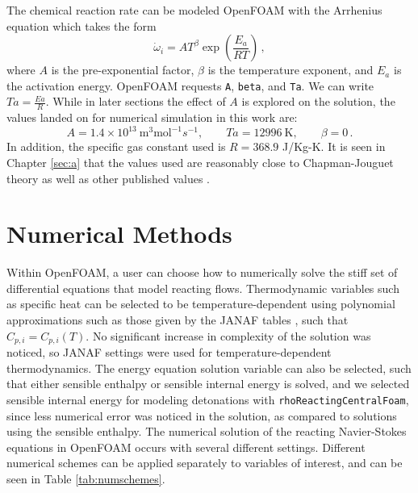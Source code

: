 The chemical reaction rate can be modeled OpenFOAM with the Arrhenius equation \cite{arrhenius} which takes the form \cite{christ} 
\begin{equation}
\dot{\omega}_i = AT^\beta \exp\left(\frac{E_a}{R T}\right)\,,
\end{equation}
where $A$ is the pre-exponential factor, $\beta$ is the temperature exponent, and $E_a$ is the activation energy. OpenFOAM requests \verb|A|, \verb|beta|, and \verb|Ta|. We can write \(Ta = \frac{Ea}{R }\). While in later sections the effect of \(A\) is explored on the solution, the values landed on for numerical simulation in this work are:
\begin{equation}
   A = 1.4 \times 10^{13} ~ \text{m}^3\text{mol}^{-1}s^{-1},
   \qquad 
   Ta = 12996 ~\text{K},
   \qquad
   \beta = 0\,.
\end{equation}
\noindent In addition, the specific gas constant used is \(R = 368.9\) J/Kg-K. It is seen in Chapter \ref{sec:a} that the values used are reasonably close to Chapman-Jouguet theory as well as other published values \cite{towery1}\cite{hashemi}. 

\section{Numerical Methods}
Within OpenFOAM, a user can choose how to numerically solve the stiff set of differential equations that model reacting flows. Thermodynamic variables such as specific heat can be selected to be temperature-dependent using polynomial approximations such as those given by the JANAF tables \cite{janaf}, such that \(C_{p,i} = C_{p,i}(T)\). No significant increase in complexity of the solution was noticed, so JANAF settings were used for temperature-dependent thermodynamics. The energy equation solution variable can also be selected, such that either sensible enthalpy or sensible internal energy is solved, and we selected sensible internal energy for modeling detonations with \verb|rhoReactingCentralFoam|, since less numerical error was noticed in the solution, as compared to solutions using the sensible enthalpy. The numerical solution of the reacting Navier-Stokes equations in OpenFOAM occurs with several different settings. Different numerical schemes can be applied separately to variables of interest, and can be seen in Table \ref{tab:numschemes}. 

